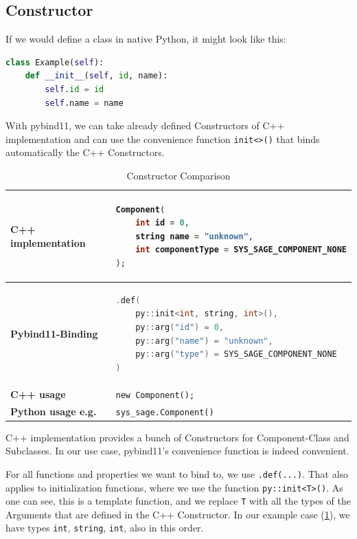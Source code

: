 \subsection{Constructor}

If we would define a class in native Python, it might look like this:

\begin{lstlisting}[language=Python, xleftmargin=4em, frame = single]
class Example(self):
    def __init__(self, id, name):
        self.id = id
        self.name = name
\end{lstlisting}

With pybind11, we can take already defined Constructors of C++ implementation and can use the convenience function \verb|init<>()| that binds automatically the C++ Constructors. \cite[see The Basics/Object-Oriented Code]{pybind11-docu}

\begin{table}[htbp]
\centering
\begin{tabular}{|l|l|}
\hline
\textbf{C++ implementation} &
\begin{lstlisting}[language=C++]
Component(
    int id = 0,
    string name = "unknown",
    int componentType = SYS_SAGE_COMPONENT_NONE
);
\end{lstlisting}
\\ \hline
\textbf{Pybind11-Binding} &
\begin{lstlisting}[language=C++]
.def(
    py::init<int, string, int>(),
    py::arg("id") = 0,
    py::arg("name") = "unknown",
    py::arg("type") = SYS_SAGE_COMPONENT_NONE
)
\end{lstlisting}
\\ \hline
\textbf{C++ usage} &
\verb|new Component();| \\ \hline
\textbf{Python usage e.g.} &
\verb|sys_sage.Component()| \\ \hline
\end{tabular}
\caption{Constructor Comparison}
\label{tab:constructor}
\end{table}

C++ implementation provides a bunch of Constructors for Component-Class and Subclasses. In our use case, pybind11's convenience function is indeed convenient.

For all functions and properties we want to bind to, we use \verb|.def(...)|. That also applies to initialization functions, where we use the function \verb|py::init<T>()|. As one can see, this is a template function, and we replace \verb|T| with all the types of the Arguments that are defined in the C++ Constructor. In our example case (\ref{tab:constructor}), we have types \verb|int|, \verb|string|, \verb|int|, also in this order. \cite[see The Basics/Object-Oriented Code]{pybind11-docu}

